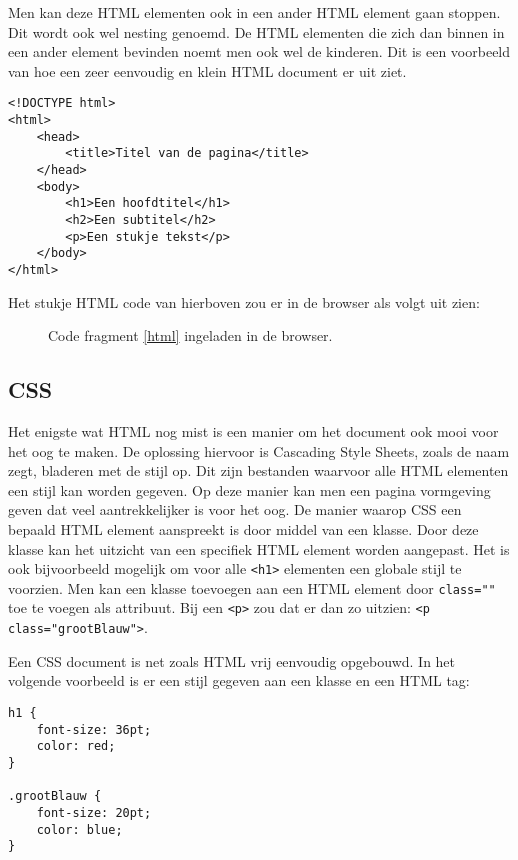 Men kan deze HTML elementen ook in een ander HTML element gaan stoppen. Dit wordt ook wel nesting genoemd. De HTML elementen die zich dan binnen in een ander element bevinden noemt men ook wel de kinderen. Dit is een voorbeeld van hoe een zeer eenvoudig en klein HTML document er uit ziet.

\begin{lstlisting}[frame=single, caption=Voorbeeld van een HTML bestand, label={html}]
<!DOCTYPE html>
<html>
	<head>
		<title>Titel van de pagina</title>
	</head>
	<body>
		<h1>Een hoofdtitel</h1>
		<h2>Een subtitel</h2>
		<p>Een stukje tekst</p>
	</body>
</html>
\end{lstlisting}

Het stukje HTML code van hierboven zou er in de browser als volgt uit zien:

\begin{figure}[h]
	\centering
	\caption{Code fragment \ref{html} ingeladen in de browser.}
	\label{fig:stereoscopie}
\end{figure}

\subsection{CSS}
Het enigste wat HTML nog mist is een manier om het document ook mooi voor het oog te maken. De oplossing hiervoor is Cascading Style Sheets, zoals de naam zegt, bladeren met de stijl op. Dit zijn bestanden waarvoor alle HTML elementen een stijl kan worden gegeven. Op deze manier kan men een pagina vormgeving geven dat veel aantrekkelijker is voor het oog. De manier waarop CSS een bepaald HTML element aanspreekt is door middel van een klasse. Door deze klasse kan het uitzicht van een specifiek HTML element worden aangepast. Het is ook bijvoorbeeld mogelijk om voor alle \lstinline[basicstyle=\ttfamily\color{red}]|<h1>| elementen een globale stijl te voorzien. Men kan een klasse toevoegen aan een HTML element door \lstinline[basicstyle=\ttfamily\color{red}]|class=""| toe te voegen als attribuut. Bij een \lstinline[basicstyle=\ttfamily\color{red}]|<p>| zou dat er dan zo uitzien: \lstinline[basicstyle=\ttfamily\color{red}]|<p class="grootBlauw">|.

Een CSS document is net zoals HTML vrij eenvoudig opgebouwd. In het volgende voorbeeld is er een stijl gegeven aan een klasse en een HTML tag:

\begin{lstlisting}[frame=single, caption=Voorbeeld van een CSS bestand]
h1 {
	font-size: 36pt;
	color: red;
}

.grootBlauw {
	font-size: 20pt;
	color: blue;
}
\end{lstlisting}

